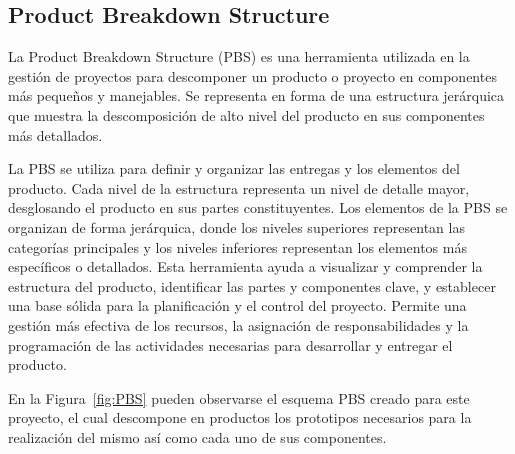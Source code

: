 \newpage

\subsection{Product Breakdown Structure}

La Product Breakdown Structure (PBS) es una herramienta utilizada en la gestión de proyectos para descomponer un producto o proyecto en componentes más pequeños y manejables. Se representa en forma de una estructura jerárquica que muestra la descomposición de alto nivel del producto en sus componentes más detallados.

La PBS se utiliza para definir y organizar las entregas y los elementos del producto. Cada nivel de la estructura representa un nivel de detalle mayor, desglosando el producto en sus partes constituyentes. Los elementos de la PBS se organizan de forma jerárquica, donde los niveles superiores representan las categorías principales y los niveles inferiores representan los elementos más específicos o detallados. Esta herramienta ayuda a visualizar y comprender la estructura del producto, identificar las partes y componentes clave, y establecer una base sólida para la planificación y el control del proyecto. Permite una gestión más efectiva de los recursos, la asignación de responsabilidades y la programación de las actividades necesarias para desarrollar y entregar el producto.

En la Figura~\ref{fig:PBS} pueden observarse el esquema PBS creado para este proyecto, el cual descompone en productos los prototipos necesarios para la realización del mismo así como cada uno de sus componentes.

